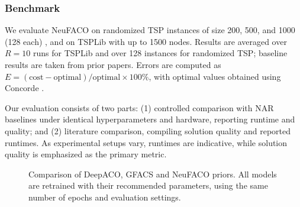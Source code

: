 \documentclass[a4paper,conference]{IEEEtran}
\begin{document}
\subsubsection{Benchmark}We evaluate NeuFACO on randomized TSP instances of size 200, 500, and 1000 (128 each) \cite{DeepACO}, and on TSPLib \cite{tsplib} with up to 1500 nodes. Results are averaged over $R=10$ runs for TSPLib and over 128 instances for randomized TSP; baseline results are taken from prior papers. Errors are computed as $E=(\text{cost}-\text{optimal})/\text{optimal}\times100\%$, with optimal values obtained using Concorde \cite{Concorde}.  

Our evaluation consists of two parts: (1) controlled comparison with NAR baselines under identical hyperparameters and hardware, reporting runtime and quality; and (2) literature comparison, compiling solution quality and reported runtimes. As experimental setups vary, runtimes are indicative, while solution quality is emphasized as the primary metric.

\begin{figure}[!htb]
  \centering


  \caption{Comparison of DeepACO, GFACS and NeuFACO priors. All models are retrained with their recommended parameters, using the same number of epochs and evaluation settings.}
  \label{fig:NAR}
\end{figure}
\end{document}
